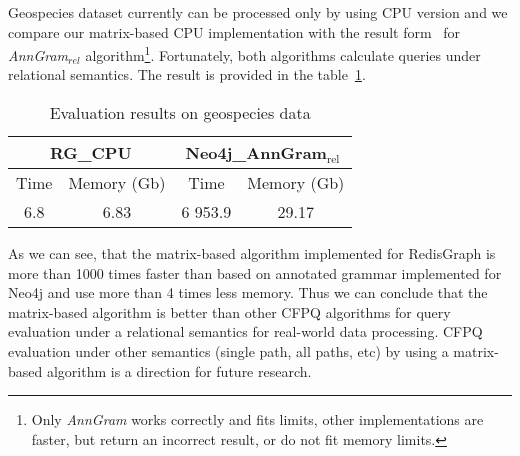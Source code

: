 Geospecies dataset currently can be processed only by using CPU version and we compare our matrix-based CPU implementation with the result form~\cite{Kuijpers:2019:ESC:3335783.3335791} for \textit{AnnGram$_{\textit{rel}}$} algorithm\footnote{Only \textit{AnnGram} works correctly and fits limits, other implementations are faster, but return an incorrect result, or do not fit memory limits.}.
Fortunately, both algorithms calculate queries under relational semantics.
The result is provided in the table~\ref{tbl:geo}.

\begin{table}[H]
\caption{Evaluation results on geospecies data}
\label{tbl:geo}
\begin{tabular}{| c | c | c | c | }
    \hline
     \multicolumn{2}{|c|}{RG\_CPU}     & \multicolumn{2}{|c|}{Neo4j\_AnnGram$_{\text{rel}}$}          \\
     \hline
     Time  & Memory (Gb)  & Time  & Memory (Gb)   \\
    \hline
    \hline
    6.8   & 6.83    & 6 953.9  & 29.17   \\
    \hline
\end{tabular}
\end{table}

As we can see, that the matrix-based algorithm implemented for RedisGraph is more than 1000 times faster than based on annotated grammar implemented for Neo4j and use more than 4 times less memory.
Thus we can conclude that the matrix-based algorithm is better than other CFPQ algorithms for query evaluation under a relational semantics for real-world data processing.
CFPQ evaluation under other semantics (single path, all paths, etc) by using a matrix-based algorithm is a direction for future research.

